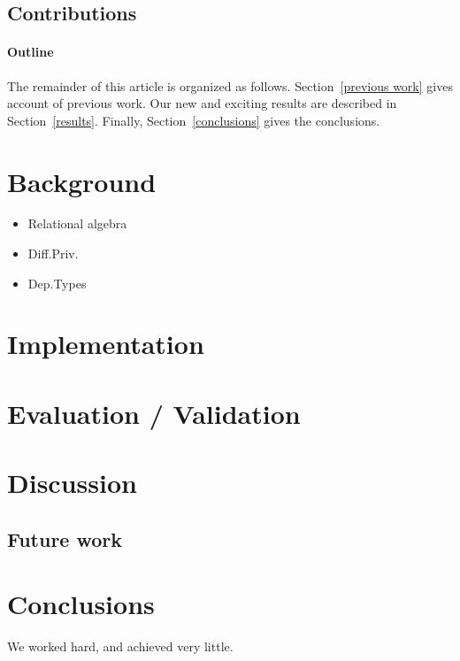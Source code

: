 \documentclass[12pt]{article}
\begin{document}
\subsection{Contributions}

\paragraph{Outline}
The remainder of this article is organized as follows.
Section~\ref{previous work} gives account of previous work.
Our new and exciting results are described in Section~\ref{results}.
Finally, Section~\ref{conclusions} gives the conclusions.

\section{Background}\label{sec:background}

\begin{itemize}
  \item Relational algebra
  \item Diff.Priv.
  \item Dep.Types
\end{itemize}

\section{Implementation}\label{sec:implementation}

\section{Evaluation / Validation}\label{sec:evaluation}

\section{Discussion}\label{sec:discussion}

\subsection{Future work}

\section{Conclusions}\label{sec:conclusions}
We worked hard, and achieved very little.



\end{document}
